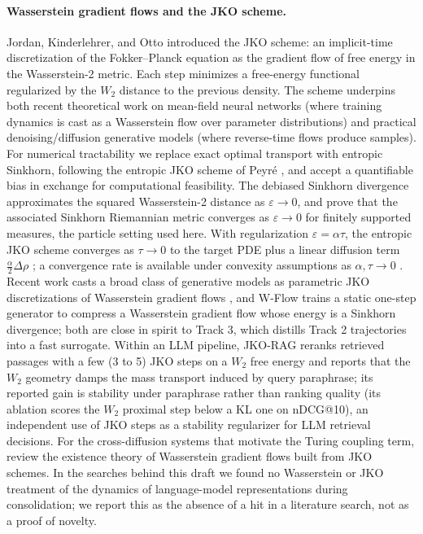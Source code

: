 \documentclass[11pt]{article}
\begin{document}
\paragraph{Wasserstein gradient flows and the JKO scheme.}
Jordan, Kinderlehrer, and Otto \cite{jko1998} introduced the JKO scheme:
an implicit-time discretization of the Fokker--Planck equation as the
gradient flow of free energy in the Wasserstein-2 metric. Each step
minimizes a free-energy functional regularized by the $W_2$ distance to
the previous density. The scheme underpins both recent theoretical work
on mean-field neural networks \cite{meimontanari2018} (where training
dynamics is cast as a Wasserstein flow over parameter distributions) and
practical denoising/diffusion generative models (where reverse-time
flows produce samples). For numerical tractability we replace exact
optimal transport with entropic Sinkhorn, following the entropic JKO
scheme of Peyr\'e \cite{peyre2015entropic}, and accept a quantifiable
bias \cite{feydy2019interpolating} in exchange for computational
feasibility. The debiased Sinkhorn divergence approximates the squared
Wasserstein-2 distance as $\varepsilon \to 0$, and
\cite{mordant2026sinkhornmetric} prove that the associated Sinkhorn
Riemannian metric converges as $\varepsilon \to 0$ for finitely
supported measures, the particle setting used here. With regularization $\varepsilon = \alpha\tau$, the
entropic JKO scheme converges as $\tau \to 0$ to the target PDE plus
a linear diffusion term $\tfrac{\alpha}{2}\Delta\rho$
\cite{baradat2025sinkhorn}; a convergence rate is available under
convexity assumptions as $\alpha, \tau \to 0$ \cite{baradat2026rate}.
Recent work casts a broad class of generative models as parametric JKO
discretizations of Wasserstein gradient flows \cite{caucheteux2026gwf},
and W-Flow \cite{han2026wflow} trains a static one-step generator to
compress a Wasserstein gradient flow whose energy is a Sinkhorn
divergence; both are close in spirit to Track 3, which distills Track 2
trajectories into a fast surrogate. Within an LLM pipeline, JKO-RAG
\cite{segal2026jkorag} reranks retrieved passages with a few (3 to 5)
JKO steps on a $W_2$ free energy and reports that the $W_2$ geometry
damps the mass transport induced by query paraphrase; its reported
gain is stability under paraphrase rather than ranking quality (its
ablation scores the $W_2$ proximal step below a KL one on nDCG@10),
an independent use of JKO steps as a stability regularizer for LLM
retrieval decisions.
For the cross-diffusion systems that motivate the Turing coupling
term, \cite{dus2026crossdiffusion} review the existence theory of
Wasserstein gradient flows built from JKO schemes. In the searches
behind this draft we found no Wasserstein or JKO treatment of the
dynamics of language-model representations during consolidation;
we report this as the absence of a hit in a literature search, not as a
proof of novelty.
\end{document}
